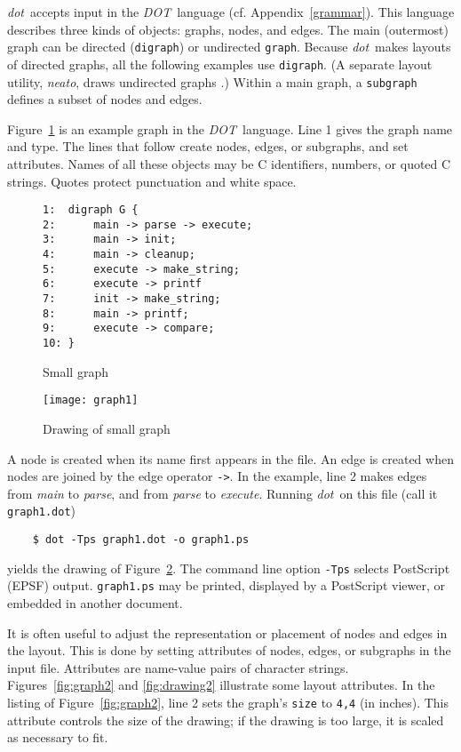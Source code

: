 \documentclass[11pt]{article}
\def\dot{{\it dot}}
\def\DOT{{\it DOT}}
\begin{document}
\dot\ accepts input in the \DOT\ language (cf. Appendix~\ref{grammar}). 
This language describes three kinds of objects:
graphs, nodes, and edges.
The main (outermost) graph can be directed
({\tt digraph}) or undirected {\tt graph}.
Because \dot\ makes layouts of directed graphs,
all the following examples use {\tt digraph}.
(A separate layout utility, {\it neato},
draws undirected graphs \cite{neatoguide}.)
Within a main graph, a {\tt subgraph} defines a
subset of nodes and edges.

Figure~\ref{fig:graph1} is an example graph in the \DOT\ language. 
Line 1 gives the graph name and type.
The lines that follow create nodes, edges, or subgraphs,
and set attributes.  Names of all these objects may be
C identifiers, numbers, or quoted C strings.
Quotes protect punctuation and white space.  

\begin{figure}[p]
\begin{verbatim}
1:  digraph G {
2:      main -> parse -> execute;
3:      main -> init;
4:      main -> cleanup;
5:      execute -> make_string;
6:      execute -> printf
7:      init -> make_string;
8:      main -> printf;
9:      execute -> compare;
10: }
\end{verbatim}
\caption{Small graph}
\label{fig:graph1}
\end{figure}

\begin{figure}[p]
	\centerline {
		\texttt{[image: graph1]}
	}
    \caption{Drawing of small graph}
    \label{fig:drawing1}
\end{figure}

A node is created when its name first appears in the file.
An edge is created when nodes are joined by the edge operator \verb"->".
In the example, line 2 makes edges from {\it main} to {\it parse},
and from {\it parse} to {\it execute}.
Running \dot\ on this file (call it \verb"graph1.dot")
\begin{verbatim}
    $ dot -Tps graph1.dot -o graph1.ps
\end{verbatim}
yields the drawing of Figure~\ref{fig:drawing1}.
The command line option \verb"-Tps" selects PostScript (EPSF) output. 
\verb"graph1.ps" may be printed, displayed by a PostScript viewer,
or embedded in another document.

It is often useful to adjust the representation or placement of nodes
and edges in the layout.  This is done by setting attributes of nodes,
edges, or subgraphs in the input file.
Attributes are name-value pairs of character strings.
Figures~\ref{fig:graph2} and \ref{fig:drawing2} illustrate
some layout attributes.  In the listing of Figure~\ref{fig:graph2},
line 2 sets the graph's {\tt size} to {\tt 4,4}
(in inches).
This attribute controls the size of the drawing; if the drawing is
too large, it is scaled as necessary to fit.
\end{document}
